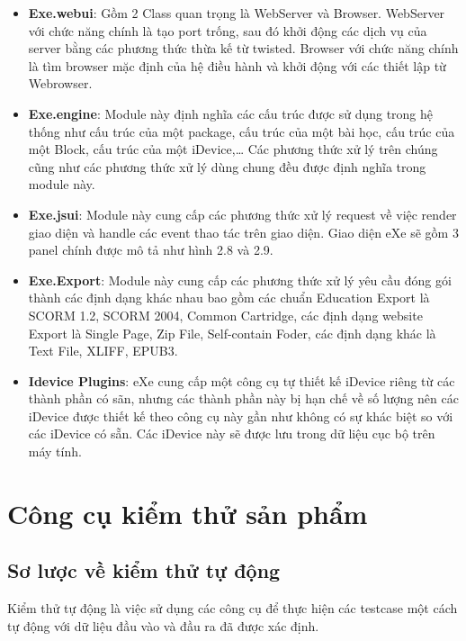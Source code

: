 \begin{itemize}
	\item \textbf{Exe.webui}: Gồm 2 Class quan trọng là WebServer và Browser. WebServer với chức năng chính là tạo port trống, sau đó khởi động các dịch vụ của server bằng các phương thức thừa kế từ twisted. Browser với chức năng chính là tìm browser mặc định của hệ điều hành và khởi động với các thiết lập từ Webrowser.
	
	\item \textbf{Exe.engine}: Module này định nghĩa các cấu trúc được sử dụng trong hệ thống như cấu trúc của một package, cấu trúc của một bài học, cấu trúc của một Block, cấu trúc của một iDevice,… Các phương thức xử lý trên chúng cũng như các phương thức xử lý dùng chung đều được định nghĩa trong module này.
	
	\item \textbf{Exe.jsui}: Module này cung cấp các phương thức xử lý request về việc render giao diện và handle các event thao tác trên giao diện. Giao diện eXe sẽ gồm 3 panel chính được mô tả như hình 2.8 và 2.9.
	
	\item \textbf{Exe.Export}: Module này cung cấp các phương thức xử lý yêu cầu đóng gói thành các định dạng khác nhau bao gồm các chuẩn Education Export là SCORM 1.2, SCORM 2004, Common Cartridge, các định dạng website Export là Single Page, Zip File, Self-contain Foder, các định dạng khác là Text File, XLIFF, EPUB3.
	
	\item \textbf{Idevice Plugins}: eXe cung cấp một công cụ tự thiết kế iDevice riêng từ các thành phần có sãn, nhưng các thành phần này bị hạn chế về số lượng nên các iDevice được thiết kế theo công cụ này gần như không có sự khác biệt so với các iDevice có sẵn. Các iDevice này sẽ được lưu trong dữ liệu cục bộ trên máy tính.									
\end{itemize}



\section{Công cụ kiểm thử sản phẩm}

\subsection{Sơ lược về kiểm thử tự động}


Kiểm thử tự động là việc sử dụng các công cụ để thực hiện các testcase một cách tự động với dữ liệu đầu vào và đầu ra đã được xác định.

